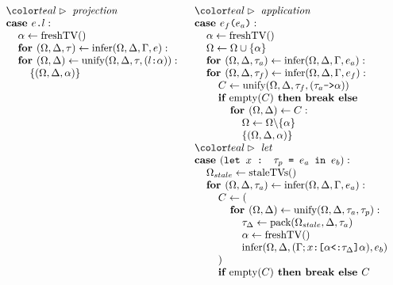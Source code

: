 \documentclass[acmsmall]{acmart}
\begin{document}
\begin{figure*}[h]
\[\begin{array}[t]{@{} l}
    \I \C{projection}
    \\
    \I \B{case } \code{$e$.$l$} :  
    \\
    \I\I \alpha \leftarrow \F{freshTV}()
    \\
    \I\I \B{for } (\Omega, \Delta, \tau) \leftarrow \F{infer}(\Omega, \Delta, \Gamma, e):
    \\
    \I\I \B{for } (\Omega, \Delta) \leftarrow \F{unify}(\Omega, \Delta, \tau, (\code{$l$:$\alpha$})):
    \\
    \I\I\I \{(\Omega, \Delta, \alpha)\}
\end{array}
\begin{array}[t]{@{} l}
    \I \C{application}
    \\
    \I \B{case } \code{$e_f$($e_a$)} :  
    \\
    \I\I \alpha \leftarrow \F{freshTV}()
    \\
    \I\I \Omega \leftarrow \Omega \cup \{\alpha\}
    \\
    \I\I \B{for } (\Omega, \Delta, \tau_a) \leftarrow \F{infer}(\Omega, \Delta, \Gamma, e_a):
    \\
    \I\I \B{for } (\Omega, \Delta, \tau_f) \leftarrow \F{infer}(\Omega, \Delta, \Gamma, e_f):
    \\
    \I\I\I C \leftarrow \F{unify}(\Omega, \Delta, \tau_f, (\code{$\tau_a$->$\alpha$}))
    \\
    \I\I\I \B{if } \F{empty}(C) \B{ then } \B{break} \B{ else }
    \\
    \I\I\I\I \B{for } (\Omega, \Delta) \leftarrow C:
    \\
    \I\I\I\I\I \Omega \leftarrow \Omega \backslash \{\alpha\}
    \\
    \I\I\I\I\I \{(\Omega, \Delta, \alpha)\}

    \\

    \I \C{let}
    \\
    \I \B{case } (\code{let $x$ : $\tau_p$ = $e_a$ in $e_b$}) :  
    \\
    \I\I \Omega_{stale} \leftarrow \F{staleTVs}()
    \\
    \I\I \B{for } (\Omega, \Delta, \tau_a) \leftarrow \F{infer}(\Omega, \Delta, \Gamma, e_a):
    \\
    \I\I\I C \leftarrow (
    \\
    \I\I\I\I \B{for } (\Omega, \Delta) \leftarrow \F{unify}(\Omega, \Delta, \tau_a, \tau_p):
    \\
    \I\I\I\I\I \tau_{\Delta} \leftarrow \F{pack}(\Omega_{stale}, \Delta, \tau_a)
    \\
    \I\I\I\I\I \alpha \leftarrow \F{freshTV}()
    \\
    \I\I\I\I\I \F{infer}(\Omega, \Delta, (\Gamma;\code{$x$:[$\alpha$<:$\tau_{\Delta}$]$\alpha$}), e_b)
    \\
    \I\I\I ) 
    \\
    \I\I\I \B{if } \F{empty}(C) \B{ then } \B{break} \B{ else } C


\end{array}\]
\end{figure*}
\end{document}
